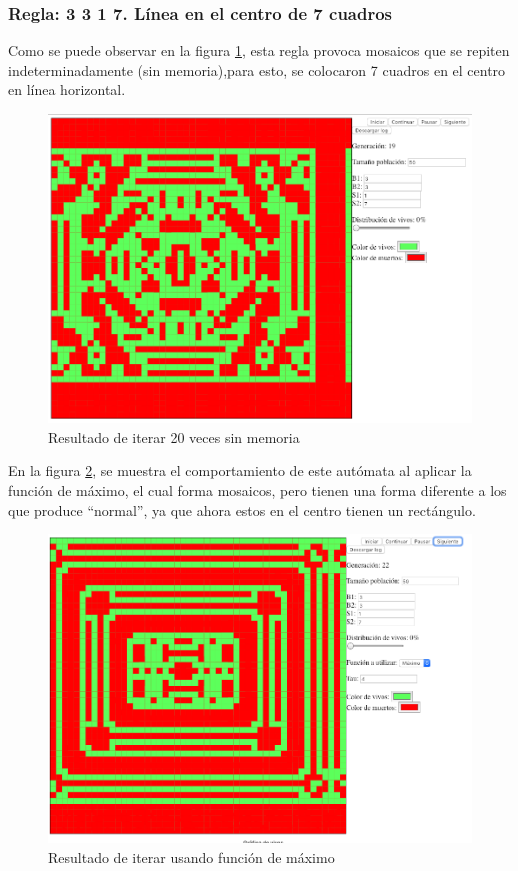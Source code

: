 	\subsubsection{Regla: 3 3 1 7. Línea en el centro de 7 cuadros}
	Como se puede observar en la figura \ref{fig:golm29}, esta regla provoca mosaicos que se repiten indeterminadamente (sin memoria),para esto, se colocaron 7 cuadros en el centro en línea horizontal.
	\begin{figure}[H]
		\begin{center}
			\includegraphics[scale=.3]{GOLM/img/regla3317-0.png}
			\caption{Resultado de iterar 20 veces sin memoria}
			\label{fig:golm29}
		\end{center}
	\end{figure}

	En la figura \ref{fig:golm30}, se muestra el comportamiento de este autómata al aplicar la función de máximo, el cual forma mosaicos, pero tienen una forma diferente a los que produce ``normal'', ya que ahora estos en el centro tienen un rectángulo.
	\begin{figure}[H]
		\begin{center}
			\includegraphics[scale=.3]{GOLM/img/regla3317-1.png}
			\caption{Resultado de iterar usando función de máximo}
			\label{fig:golm30}
		\end{center}
	\end{figure}

